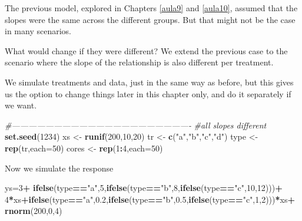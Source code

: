\documentclass[
]{book}
\newenvironment{Shaded}{\begin{snugshade}}{\end{snugshade}}
\newcommand{\CommentTok}[1]{\textcolor[rgb]{0.56,0.35,0.01}{\textit{#1}}}
\newcommand{\DataTypeTok}[1]{\textcolor[rgb]{0.13,0.29,0.53}{#1}}
\newcommand{\DecValTok}[1]{\textcolor[rgb]{0.00,0.00,0.81}{#1}}
\newcommand{\FloatTok}[1]{\textcolor[rgb]{0.00,0.00,0.81}{#1}}
\newcommand{\KeywordTok}[1]{\textcolor[rgb]{0.13,0.29,0.53}{\textbf{#1}}}
\newcommand{\NormalTok}[1]{#1}
\newcommand{\OperatorTok}[1]{\textcolor[rgb]{0.81,0.36,0.00}{\textbf{#1}}}
\newcommand{\StringTok}[1]{\textcolor[rgb]{0.31,0.60,0.02}{#1}}
\begin{document}
The previous model, explored in Chapters \ref{aula9} and \ref{aula10}, assumed that the slopes were the same across the different groups. But that might not be the case in many scenarios.

What would change if they were different? We extend the previous case to the scenario where the slope of the relationship is also different per treatment.

We simulate treatments and data, just in the same way as before, but this gives us the option to change things later in this chapter only, and do it separately if we want.

\begin{Shaded}
\begin{Highlighting}[]
\CommentTok{#----------------------------------------------------------------}
\CommentTok{#all slopes different}
\KeywordTok{set.seed}\NormalTok{(}\DecValTok{1234}\NormalTok{)}
\NormalTok{xs <-}\StringTok{ }\KeywordTok{runif}\NormalTok{(}\DecValTok{200}\NormalTok{,}\DecValTok{10}\NormalTok{,}\DecValTok{20}\NormalTok{)}
\NormalTok{tr <-}\StringTok{ }\KeywordTok{c}\NormalTok{(}\StringTok{"a"}\NormalTok{,}\StringTok{"b"}\NormalTok{,}\StringTok{"c"}\NormalTok{,}\StringTok{"d"}\NormalTok{)}
\NormalTok{type <-}\StringTok{ }\KeywordTok{rep}\NormalTok{(tr,}\DataTypeTok{each=}\DecValTok{50}\NormalTok{)}
\NormalTok{cores <-}\StringTok{ }\KeywordTok{rep}\NormalTok{(}\DecValTok{1}\OperatorTok{:}\DecValTok{4}\NormalTok{,}\DataTypeTok{each=}\DecValTok{50}\NormalTok{)}
\end{Highlighting}
\end{Shaded}

Now we simulate the response

\begin{Shaded}
\begin{Highlighting}[]
\NormalTok{ys=}\DecValTok{3}\OperatorTok{+}
\KeywordTok{ifelse}\NormalTok{(type}\OperatorTok{==}\StringTok{"a"}\NormalTok{,}\DecValTok{5}\NormalTok{,}\KeywordTok{ifelse}\NormalTok{(type}\OperatorTok{==}\StringTok{"b"}\NormalTok{,}\DecValTok{8}\NormalTok{,}\KeywordTok{ifelse}\NormalTok{(type}\OperatorTok{==}\StringTok{"c"}\NormalTok{,}\DecValTok{10}\NormalTok{,}\DecValTok{12}\NormalTok{)))}\OperatorTok{+}
\DecValTok{4}\OperatorTok{*}\NormalTok{xs}\OperatorTok{+}\KeywordTok{ifelse}\NormalTok{(type}\OperatorTok{==}\StringTok{"a"}\NormalTok{,}\FloatTok{0.2}\NormalTok{,}\KeywordTok{ifelse}\NormalTok{(type}\OperatorTok{==}\StringTok{"b"}\NormalTok{,}\FloatTok{0.5}\NormalTok{,}\KeywordTok{ifelse}\NormalTok{(type}\OperatorTok{==}\StringTok{"c"}\NormalTok{,}\DecValTok{1}\NormalTok{,}\DecValTok{2}\NormalTok{)))}\OperatorTok{*}\NormalTok{xs}\OperatorTok{+}
\KeywordTok{rnorm}\NormalTok{(}\DecValTok{200}\NormalTok{,}\DecValTok{0}\NormalTok{,}\DecValTok{4}\NormalTok{)}
\end{Highlighting}
\end{Shaded}
\end{document}
